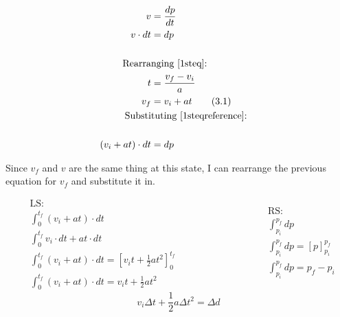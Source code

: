 \documentclass[11pt]{article}
\begin{document}
\begin{align*}
    {v} &= \frac{dp}{dt} \\
    {v} \cdot {dt} &= {dp} \\
    & \\
    \text{Rearra} & \text{nging \eqref{1steq}:} \\
    t &= \frac{v_f - v_i}{a} \\
    v_f &= v_i + at \tag{3.1} \label{1steqreference} 
    & \\
    \text{Substi} & \text{tuting \eqref{1steqreference}:} \\
    & \\
    ({v_i} + {a}t) \cdot {dt} &= {dp} \\
\end{align*}

\vspace{-0.75cm}

Since $v_f$ and $v$ are the same thing at this state, I can rearrange the previous equation for $v_f$ and substitute it in.

\begin{equation*}
\begin{aligned}
	&\text{LS:} \\
    &\int_{0}^{t_f} (v_i + {a}t) \cdot dt \\
    &\int_{0}^{t_f} v_i \cdot {dt} + at \cdot dt \\
    &\int_{0}^{t_f} ({v_i} + {a} t) \cdot dt = [{v_i}t + \frac{1}{2}{a} t^2]^{t_f}_{0} \\
    &\int_{0}^{t_f} ({v_i} + {a} t) \cdot dt = {v_i} t + \frac{1}{2}{a} t^2
\end{aligned}
\qquad\qquad\qquad\qquad
\begin{aligned}
    &\text{RS:} \\
    &\int_{p_i}^{p_f} dp \\
	&\int_{p_i}^{p_f} dp = [p]_{p_i}^{p_f} \\
	&\int_{p_i}^{p_f} dp = p_f - p_i \\
\end{aligned}
\end{equation*} %
\begin{equation*}
    {v_i}\Delta t + \frac{1}{2}{a}\Delta t^2 = \Delta d \tag{4} \label{2ndeq}
\end{equation*}
\end{document}

